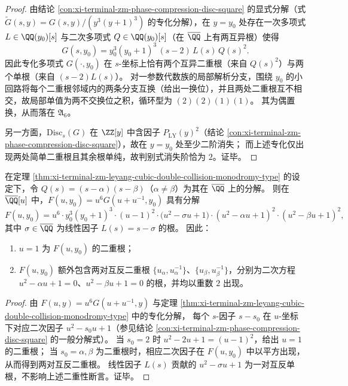 \begin{proof}
由结论 \ref{con:xi-terminal-zm-phase-compression-disc-square} 的显式分解（式 \(\widetilde G(s,y)=G(s,y)/(y^3(y+1)^3)\) 的专化分解），在 \(y=y_0\) 处存在一次多项式 \(L\in\QQ(y_0)[s]\) 与二次多项式 \(Q\in\QQ(y_0)[s]\)（在 \(\overline{\QQ}\) 上有两互异根）使得
\[
G(s,y_0)=y_0^3(y_0+1)^3\,(s-2)\,L(s)\,Q(s)^2.
\]
因此专化多项式 \(G(\cdot,y_0)\) 在 \(s\)-坐标上恰有两个互异二重根（来自 \(Q(s)^2\)）与两个单根（来自 \((s-2)L(s)\)）。
对一参数代数族的局部解析分支，围绕 \(y_0\) 的小回路将每个二重根邻域内的两条分支互换（给出一换位），并且两处二重根互不相交，故局部单值为两不交换位之积，循环型为 \((2)(2)(1)(1)\)。
其为偶置换，从而落在 \(\mathfrak A_6\)。
\par
另一方面，\(\mathrm{Disc}_s(G)\) 在 \(\ZZ[y]\) 中含因子 \(P_{\mathrm{LY}}(y)^2\)（结论 \ref{con:xi-terminal-zm-phase-compression-disc-square}），故在 \(y=y_0\) 处至少二阶消失；
而上述专化仅出现两处简单二重根且其余根单纯，故判别式消失阶恰为 \(2\)。证毕。
\end{proof}

\begin{corollary}\label{cor:xi-terminal-zm-leyang-u-root-pinning-double}
在定理 \ref{thm:xi-terminal-zm-leyang-cubic-double-collision-monodromy-type} 的设定下，令 \(Q(s)=(s-\alpha)(s-\beta)\)（\(\alpha\neq\beta\)）为其在 \(\overline{\QQ}\) 上的分解。
则在 \(\overline{\QQ}[u]\) 中，\(F(u,y_0)=u^6G(u+u^{-1},y_0)\) 具有分解
\[
F(u,y_0)=u^{6}\cdot y_0^3(y_0+1)^3\cdot (u-1)^2\cdot \bigl(u^2-\sigma u+1\bigr)\cdot (u^2-\alpha u+1)^2\cdot (u^2-\beta u+1)^2,
\]
其中 \(\sigma\in\overline{\QQ}\) 为线性因子 \(L(s)=s-\sigma\) 的根。
因此：
\begin{enumerate}
  \item \(u=1\) 为 \(F(u,y_0)\) 的二重根；
  \item \(F(u,y_0)\) 额外包含两对互反二重根 \(\{u_\alpha,u_\alpha^{-1}\}\)、\(\{u_\beta,u_\beta^{-1}\}\)，分别为二次方程 \(u^2-\alpha u+1=0\)、\(u^2-\beta u+1=0\) 的根，并均以重数 \(2\) 出现。
\end{enumerate}
\end{corollary}

\begin{proof}
由 \(F(u,y)=u^6G(u+u^{-1},y)\) 与定理 \ref{thm:xi-terminal-zm-leyang-cubic-double-collision-monodromy-type} 中的专化分解，
每个 \(s\)-因子 \(s-s_0\) 在 \(u\)-坐标下对应二次因子 \(u^2-s_0u+1\)（参见结论 \ref{con:xi-terminal-zm-phase-compression-disc-square} 的一般分解式）。
当 \(s_0=2\) 时 \(u^2-2u+1=(u-1)^2\)，给出 \(u=1\) 的二重根；
当 \(s_0=\alpha,\beta\) 为二重根时，相应二次因子在 \(F(u,y_0)\) 中以平方出现，从而得到两对互反二重根。
线性因子 \(L(s)\) 贡献的 \(u^2-\sigma u+1\) 为一对互反单根，不影响上述二重性断言。证毕。
\end{proof}

